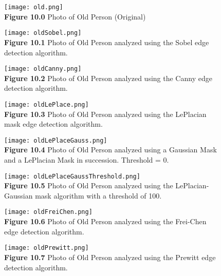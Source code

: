\documentclass{article}%
\begin{document}
\clearpage


\newpage
\begin{figure}[h]
\centering
\texttt{[image: old.png]}\\
{\bf Figure 10.0} Photo of Old Person (Original)
\end{figure}


\newpage
\begin{figure}[h]
\centering
\texttt{[image: oldSobel.png]}\\
{\bf Figure 10.1} Photo of Old Person analyzed using the Sobel edge detection algorithm.   
\end{figure}

\newpage
\begin{figure}[h]
\centering
\texttt{[image: oldCanny.png]}\\
{\bf Figure 10.2} Photo of Old Person analyzed using the Canny edge detection algorithm.   
\end{figure}

\newpage
\begin{figure}[h]
\centering
\texttt{[image: oldLePlace.png]}\\
{\bf Figure 10.3} Photo of Old Person analyzed using the LePlacian mask edge detection algorithm.  
\end{figure}

\newpage
\begin{figure}[h]
\centering
\texttt{[image: oldLePlaceGauss.png]}\\
{\bf Figure 10.4} Photo of Old Person analyzed using a Gaussian Mask and a LePlacian Mask in succession. Threshold = 0.   
\end{figure}

\newpage
\begin{figure}[h]
\centering
\texttt{[image: oldLePlaceGaussThreshold.png]}\\
{\bf Figure 10.5} Photo of Old Person analyzed using the LePlacian-Gaussian mask algorithm with a threshold of 100.  
\end{figure}

\newpage
\begin{figure}[h]
\centering
\texttt{[image: oldFreiChen.png]}\\
{\bf Figure 10.6} Photo of Old Person analyzed using the Frei-Chen edge detection algorithm.  
\end{figure}

\newpage
\begin{figure}[h]
\centering
\texttt{[image: oldPrewitt.png]}\\
{\bf Figure 10.7} Photo of Old Person analyzed using the Prewitt edge detection algorithm.  
\end{figure}
\end{document}
